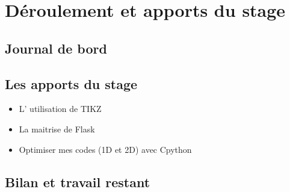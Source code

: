 
\chapter{Déroulement et apports du stage} %

\label{Chapter6} %







\section{Journal de bord}












\section{Les apports du stage}







\begin{itemize}
   \item L' utilisation de TIKZ
   \item La maitrise de Flask
\end{itemize}

\begin{itemize}
    \item Optimiser mes codes (1D et 2D) avec Cpython
\end{itemize}














\section{Bilan et travail restant}